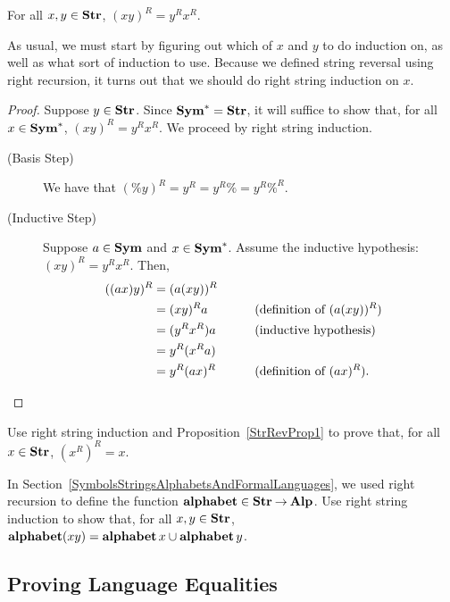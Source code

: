 \begin{proposition}
\label{StrRevProp1}
For all $x,y\in\mathbf{Str}$, $(xy)^R = y^R x^R$.
\end{proposition}

As usual, we must start by figuring out which of $x$ and $y$
to do induction on, as well as what sort of induction to use.
Because we defined string reversal using right recursion,
it turns out that we should do right string induction
%
on $x$.

\begin{proof}
Suppose $y\in\mathbf{Str}$.  Since $\mathbf{Sym}^*=\mathbf{Str}$, it will suffice to
show that, for all $x\in\mathbf{Sym}^*$, $(xy)^R = y^R x^R$.  We proceed by
right string induction.
\begin{description}
\item[\quad(Basis Step)] We have that $(\%y)^R = y^R = y^R\% = y^R\%^R$.

\item[\quad(Inductive Step)] Suppose $a\in\mathbf{Sym}$ and $x\in\mathbf{Sym}^*$.  Assume
the inductive hypothesis: $(xy)^R = y^R x^R$.  Then,
\begin{alignat*}{2}
((ax)y)^R &= (a(xy))^R \\
&= (xy)^Ra && \qquad{\textrm{(definition of $(a(xy))^R$)}} \\
&= (y^Rx^R)a && \qquad{\textrm{(inductive hypothesis)}} \\
&= y^R(x^Ra) \\
&= y^R(ax)^R && \qquad{\textrm{(definition of $(ax)^R$)}}.
\end{alignat*}
\end{description}
\end{proof}

\begin{exercise}
\label{StrRevEx}
Use right string induction and Proposition~\ref{StrRevProp1} to prove
that, for all $x\in\mathbf{Str}$, $(x^R)^R=x$.
\end{exercise}

\begin{exercise}
In Section~\ref{SymbolsStringsAlphabetsAndFormalLanguages}, we used
right recursion to define the function
$\mathbf{alphabet}\in\mathbf{Str}\mathbin{\to}\mathbf{Alp}$.  Use right string induction to show
that,
%
%
%
for all $x,y\in\mathbf{Str}$, $\mathbf{alphabet}(xy)=\mathbf{alphabet}\,x\cup\mathbf{alphabet}\,y$.
\end{exercise}

\subsection{Proving Language Equalities}

